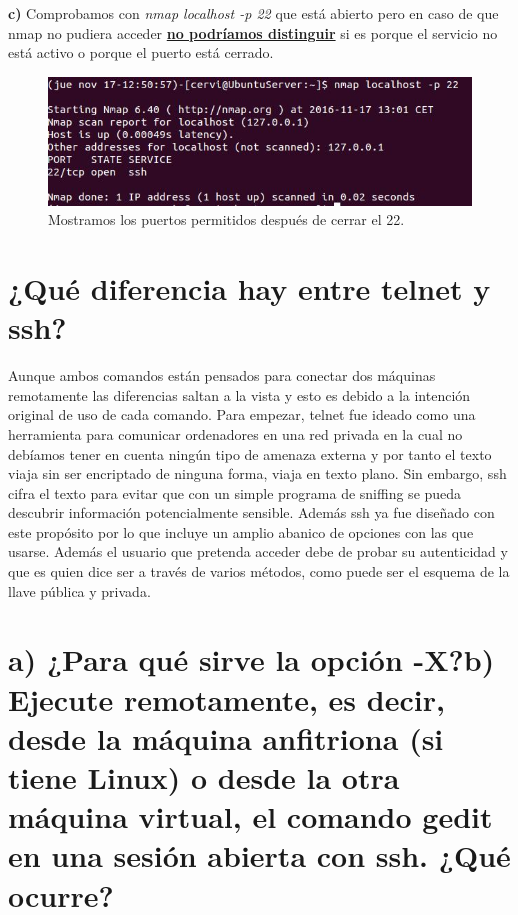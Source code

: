 \textbf{c) } Comprobamos con \textit{nmap localhost -p 22} que está abierto pero en caso de que nmap no pudiera acceder \underline{\textbf{no podríamos distinguir}} si es porque el servicio no está activo o porque el puerto está cerrado.

\begin{figure}[H]
	\centering
	\includegraphics[scale=0.75]{nmap-accesible.jpg}
	\caption{Mostramos los puertos permitidos después de cerrar el 22. \label{fig:figura5}}
\end{figure}
\section{¿Qué diferencia hay entre telnet y ssh?}
Aunque ambos comandos están pensados para conectar dos máquinas remotamente las diferencias saltan a la vista y esto es debido a la intención original de uso de cada comando. Para empezar, telnet\cite{telnet} fue ideado como una herramienta para comunicar ordenadores en una red privada en la cual no debíamos tener en cuenta ningún tipo de amenaza externa y por tanto el texto viaja sin ser encriptado de ninguna forma, viaja en texto plano. Sin embargo, ssh\cite{ssh} cifra el texto para evitar que con un simple programa de sniffing se pueda descubrir información potencialmente sensible. Además ssh ya fue diseñado con este propósito por lo que incluye un amplio abanico de opciones con las que usarse. Además el usuario que pretenda acceder debe de probar su autenticidad y que es quien dice ser a través de varios métodos, como puede ser el esquema de la llave pública y privada.
\section{\textbf{a)} ¿Para qué sirve la opción -X?\newline \textbf{b)} Ejecute remotamente, es
	decir, desde la máquina anfitriona (si tiene Linux) o desde la otra máquina
	virtual, el comando gedit en una sesión abierta con ssh. ¿Qué ocurre?}

